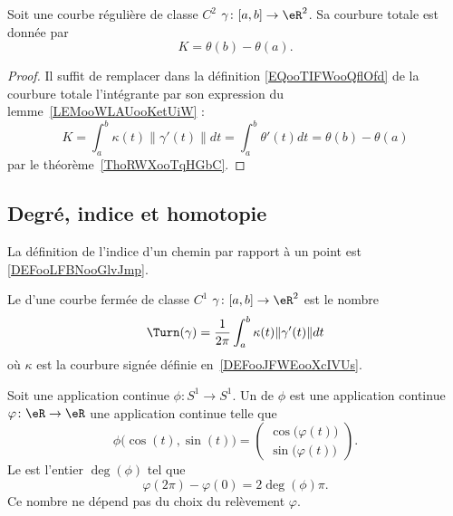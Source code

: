 \begin{lemma}
	Soit une courbe régulière de classe \( C^2\) \( \gamma\colon \mathopen[ a , b \mathclose]\to \eR^2\). Sa courbure totale est donnée par
	\begin{equation}
		K=\theta(b)-\theta(a).
	\end{equation}
\end{lemma}

\begin{proof}
	Il suffit de remplacer dans la définition \eqref{EQooTIFWooQflOfd} de la courbure totale l'intégrante par son expression du lemme~\ref{LEMooWLAUooKetUiW} :
	\begin{equation}
		K=\int_a^b\kappa(t)\| \gamma'(t) \|dt=\int_a^b\theta'(t)dt=\theta(b)-\theta(a)
	\end{equation}
	par le théorème~\ref{ThoRWXooTqHGbC}.
\end{proof}

\subsection{Degré, indice et homotopie}

La définition de l'indice d'un chemin par rapport à un point est \ref{DEFooLFBNooGlvJmp}.

\begin{definition}
	Le  d'une courbe fermée de classe \( C^1\) \( \gamma\colon \mathopen[ a , b \mathclose]\to \eR^2\) est le nombre
	\begin{equation}
		\Turn(\gamma)=\frac{1}{ 2\pi }\int_a^b\kappa(t)\| \gamma'(t) \|dt
	\end{equation}
	où \( \kappa\) est la courbure signée définie en~\ref{DEFooJFWEooXcIVUs}.
\end{definition}

\begin{lemmaDef}        \label{DEFooTKBUooNVcheO}
	Soit une application continue \( \phi\colon S^1\to S^1\). Un  de \( \phi\) est une application continue \( \varphi\colon \eR\to \eR\) une application continue telle que
	\begin{equation}
		\phi\big( \cos(t),\sin(t) \big)=\begin{pmatrix}
			\cos\big( \varphi(t) \big) \\
			\sin\big( \varphi(t) \big)
		\end{pmatrix}.
	\end{equation}
	Le  est l'entier \( \deg(\phi)\) tel que
	\begin{equation}
		\varphi(2\pi)-\varphi(0)=2\deg(\phi)\pi.
	\end{equation}
	Ce nombre ne dépend pas du choix du relèvement \( \varphi\).
\end{lemmaDef}


